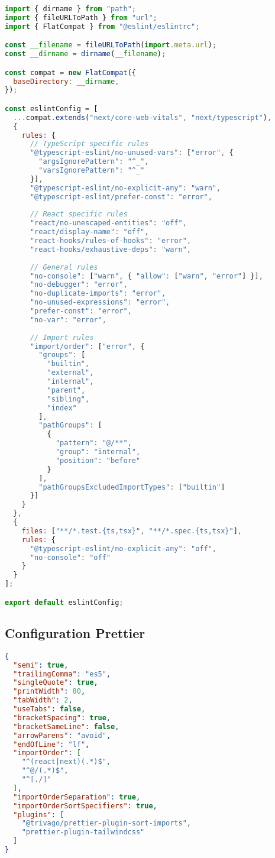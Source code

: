 \begin{lstlisting}[language=JavaScript, caption=eslint.config.js]
import { dirname } from "path";
import { fileURLToPath } from "url";
import { FlatCompat } from "@eslint/eslintrc";

const __filename = fileURLToPath(import.meta.url);
const __dirname = dirname(__filename);

const compat = new FlatCompat({
  baseDirectory: __dirname,
});

const eslintConfig = [
  ...compat.extends("next/core-web-vitals", "next/typescript"),
  {
    rules: {
      // TypeScript specific rules
      "@typescript-eslint/no-unused-vars": ["error", { 
        "argsIgnorePattern": "^_",
        "varsIgnorePattern": "^_" 
      }],
      "@typescript-eslint/no-explicit-any": "warn",
      "@typescript-eslint/prefer-const": "error",
      
      // React specific rules
      "react/no-unescaped-entities": "off",
      "react/display-name": "off",
      "react-hooks/rules-of-hooks": "error",
      "react-hooks/exhaustive-deps": "warn",
      
      // General rules
      "no-console": ["warn", { "allow": ["warn", "error"] }],
      "no-debugger": "error",
      "no-duplicate-imports": "error",
      "no-unused-expressions": "error",
      "prefer-const": "error",
      "no-var": "error",
      
      // Import rules
      "import/order": ["error", {
        "groups": [
          "builtin",
          "external",
          "internal",
          "parent",
          "sibling",
          "index"
        ],
        "pathGroups": [
          {
            "pattern": "@/**",
            "group": "internal",
            "position": "before"
          }
        ],
        "pathGroupsExcludedImportTypes": ["builtin"]
      }]
    }
  },
  {
    files: ["**/*.test.{ts,tsx}", "**/*.spec.{ts,tsx}"],
    rules: {
      "@typescript-eslint/no-explicit-any": "off",
      "no-console": "off"
    }
  }
];

export default eslintConfig;
\end{lstlisting}

\subsection{Configuration Prettier}

\begin{lstlisting}[language=JSON, caption=.prettierrc.json]
{
  "semi": true,
  "trailingComma": "es5",
  "singleQuote": true,
  "printWidth": 80,
  "tabWidth": 2,
  "useTabs": false,
  "bracketSpacing": true,
  "bracketSameLine": false,
  "arrowParens": "avoid",
  "endOfLine": "lf",
  "importOrder": [
    "^(react|next)(.*)$",
    "^@/(.*)$",
    "^[./]"
  ],
  "importOrderSeparation": true,
  "importOrderSortSpecifiers": true,
  "plugins": [
    "@trivago/prettier-plugin-sort-imports",
    "prettier-plugin-tailwindcss"
  ]
}
\end{lstlisting}

